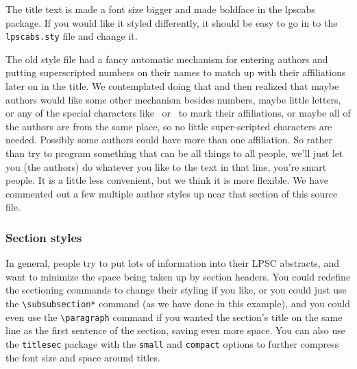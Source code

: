 \documentclass[twoside]{article}
\begin{document}
The title text is made a font size bigger and made boldface in the
lpscabs package.  If you would like it styled differently, it should
be easy to go in to the \texttt{lpscabs.sty} file and change it.

The old style file had a fancy automatic mechanism for entering
authors and putting superscripted numbers on their names to match
up with their affiliations later on in the title.  We contemplated
doing that and then realized that maybe authors would like some
other mechanism besides numbers, maybe little letters, or any of
the special characters like \dag\ or \ddag\ to mark their affiliations,
or maybe all of the authors are from the same place, so no little
super-scripted characters are needed.  Possibly some authors could
have more than one affiliation.  So rather than try to program
something that can be all things to all people, we'll just let you
(the authors) do whatever you like to the text in that line, you're
smart people.  It is a little less convenient, but we think it is more
flexible.  We have commented out a few multiple author styles up
near that section of this source file.

% 

\subsubsection*{Section styles}

In general, people try to put lots of information into their LPSC
abstracts, and want to minimize the space being taken up by section
headers.  You could redefine the sectioning commands to change their
styling if you like, or you could just use the \verb=\subsubsection*=
command (as we have done in this example), and
you could even use the \verb=\paragraph= command if you wanted the
section's title on the same line as the first sentence of the
section, saving even more space.  You can also use the \texttt{titlesec}
package with the \texttt{small} and \texttt{compact} options to further
compress the font size and space around titles.
\end{document}
